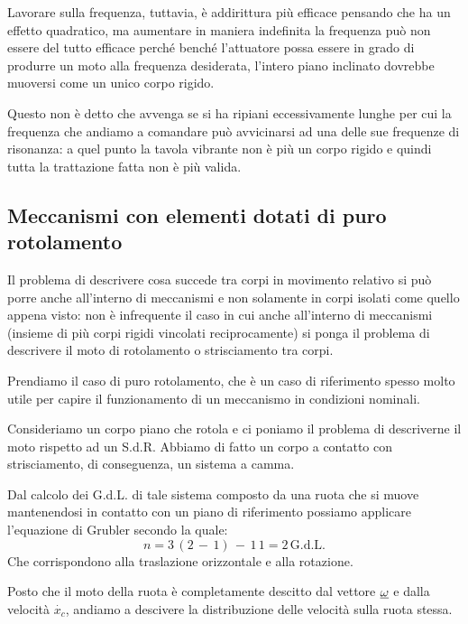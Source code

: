 Lavorare sulla frequenza, tuttavia, è addirittura più efficace pensando che ha un effetto quadratico, ma aumentare in maniera indefinita la frequenza può non essere del tutto efficace perché benché l'attuatore possa essere in grado di produrre un moto alla frequenza desiderata, l'intero piano inclinato dovrebbe muoversi come un unico corpo rigido.

Questo non è detto che avvenga se si ha ripiani eccessivamente lunghe per cui la frequenza che andiamo a comandare può avvicinarsi ad una delle sue frequenze di risonanza: a quel punto la tavola vibrante non è più un corpo rigido e quindi tutta la trattazione fatta non è più valida.

\subsection{Meccanismi con elementi dotati di puro rotolamento}

Il problema di descrivere cosa succede tra corpi in movimento relativo si può porre anche all'interno di meccanismi e non solamente in corpi isolati come quello appena visto: non è infrequente il caso in cui anche all'interno di meccanismi (insieme di più corpi rigidi vincolati reciprocamente) si ponga il problema di descrivere il moto di rotolamento o strisciamento tra corpi.

Prendiamo il caso di puro rotolamento, che è un caso di riferimento spesso molto utile per capire il funzionamento di un meccanismo in condizioni nominali.

Consideriamo un corpo piano che rotola e ci poniamo il problema di descriverne il moto rispetto ad un S.d.R. Abbiamo di fatto un corpo a contatto con strisciamento, di conseguenza, un sistema a camma.

Dal calcolo dei G.d.L. di tale sistema composto da una ruota che si muove mantenendosi in contatto con un piano di riferimento possiamo applicare l'equazione di Grubler secondo la quale:
\[n = 3\,(2\,-\,1)\,-\,1\,1 = 2\,\text{G.d.L.}\]
Che corrispondono alla traslazione orizzontale e alla rotazione.

Posto che il moto della ruota è completamente descitto dal vettore $\underline{\omega}$ e dalla velocità $\dot{x_c}$, andiamo a descivere la distribuzione delle velocità sulla ruota stessa.
\vspace{1mm}

